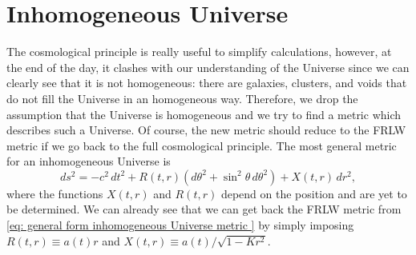 \section{Inhomogeneous Universe}
The cosmological principle is really useful to simplify calculations, however, at the end of the day, it clashes with our understanding of the Universe since we can clearly see that it is not homogeneous: there are galaxies, clusters, and voids that do not fill the Universe in an homogeneous way. Therefore, we drop the assumption that the Universe is homogeneous and we try to find a metric which describes such a Universe. Of course, the new metric should reduce to the FRLW metric if we go back to the full cosmological principle. The most general metric for an inhomogeneous Universe is 
\begin{equation}
\label{eq: general form inhomogeneous Universe metric }
    ds^2 = -c^2\,dt^2 + R(t,r)(d\theta^2 + \sin^2\theta\,d\theta^2) + X(t,r)\,dr^2,
\end{equation}
where the functions $X(t,r)$ and $R(t,r)$ depend on the position and are yet to be determined. We can already see that we can get back the FRLW metric from \eqref{eq: general form inhomogeneous Universe metric } by simply imposing $R(t,r) \equiv a(t)r$ and $X(t,r) \equiv a(t)/\sqrt{1 - Kr^2}$.

